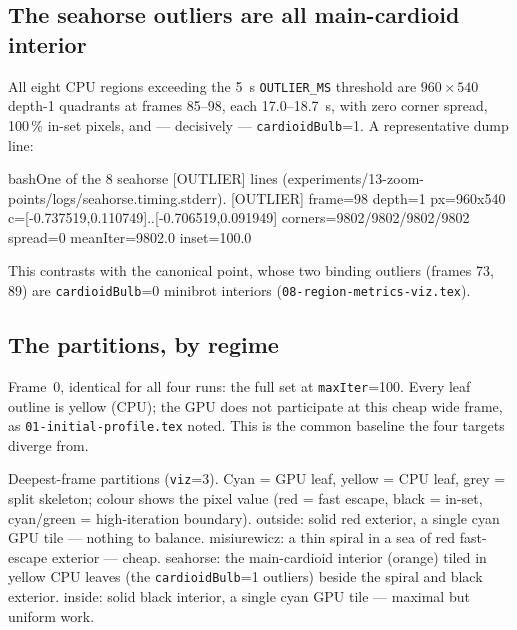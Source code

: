 \documentclass[
	english,
	letterpaper, oneside
]{article}
\begin{document}
\subsection{The seahorse outliers are all main-cardioid interior}

All eight CPU regions exceeding the 5~s \texttt{OUTLIER\_MS} threshold are
$960\times540$ depth-1 quadrants at frames 85--98, each 17.0--18.7~s, with zero
corner spread, 100\,\% in-set pixels, and --- decisively ---
\texttt{cardioidBulb}=1. A representative dump line:

\begin{sourcecode}{bash}{One of the 8 seahorse [OUTLIER] lines (experiments/13-zoom-points/logs/seahorse.timing.stderr).}
[OUTLIER] frame=98 depth=1 px=960x540 c=[-0.737519,0.110749]..[-0.706519,0.091949]
  corners=9802/9802/9802/9802 spread=0 meanIter=9802.0 inset=100.0%
\end{sourcecode}

This contrasts with the canonical point, whose two binding outliers (frames 73,
89) are \texttt{cardioidBulb}=0 minibrot interiors (\texttt{08-region-metrics-viz.tex}).

\subsection{The partitions, by regime}

            {Frame~0, identical for all four runs: the full set at
             \texttt{maxIter}=100. Every leaf outline is yellow (CPU); the
             GPU does not participate at this cheap wide frame, as
             \texttt{01-initial-profile.tex} noted. This is the common baseline
             the four targets diverge from. \label{fig:base}}

            {Deepest-frame partitions (\texttt{viz}=3). Cyan = GPU leaf, yellow =
             CPU leaf, grey = split skeleton; colour shows the pixel value
             (red = fast escape, black = in-set, cyan/green = high-iteration
             boundary). outside: solid red exterior, a single cyan GPU
             tile --- nothing to balance. misiurewicz: a thin spiral in a
             sea of red fast-escape exterior --- cheap. seahorse: the
             main-cardioid interior (orange) tiled in yellow CPU leaves (the
             \texttt{cardioidBulb}=1 outliers) beside the spiral and black
             exterior. inside: solid black interior, a single cyan GPU
             tile --- maximal but uniform work. \label{fig:regimes}}
\end{document}
